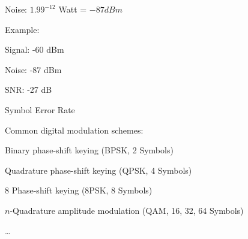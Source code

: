 \documentclass[9pt]{article}
\begin{document}
\begin{slide}
\bi
	\item Noise: $1.99^{-12}$ Watt = $-87 dBm$
	\item Example:
	\bi
		\item Signal: -60 dBm
		\item Noise: -87 dBm
		\item SNR: -27 dB
	\ei
\ei
\end{slide}



\begin{slide}
\bi
	\item Symbol Error Rate
	\item Common digital modulation schemes:
	\bi
		\item Binary phase-shift keying (BPSK, 2 Symbols)
		\item Quadrature phase-shift keying (QPSK, 4 Symbols)
		\item 8 Phase-shift keying (8PSK, 8 Symbols)
		\item $n$-Quadrature amplitude modulation (QAM, 16, 32, 64 Symbols)
		\item \dots
	\ei
\ei
\end{slide}
\end{document}
